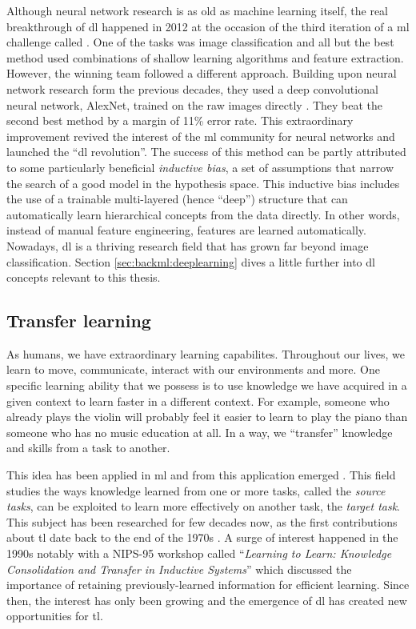 Although neural network research is as old as machine learning itself, the real
breakthrough of \acrlong{dl} happened in 2012 at the occasion of the third iteration
of a \acrlong{ml} challenge called  \cite{russakovsky2015imagenet}.
One of the tasks was image classification and all but the best method used
combinations of shallow learning algorithms and feature extraction. However, the
winning team followed a different approach. Building upon neural network research
form the previous decades, they used a deep convolutional neural network, AlexNet,
trained on the raw images directly \cite{krizhevsky2012imagenet}. They beat
the second best method by a margin of 11\% error rate. This extraordinary improvement
revived the interest of the \acrlong{ml} community for neural networks and launched
the ``\acrlong{dl} revolution''. The success of this method can be partly attributed
to some particularly beneficial \textit{inductive bias}, a set of assumptions
that narrow the search of a good model in the hypothesis space. This inductive
bias includes the use of a trainable multi-layered (hence ``deep'') structure that
can automatically learn hierarchical concepts from the data directly. In other
words, instead of manual feature engineering, features are learned automatically.
Nowadays, \acrlong{dl} is a thriving research field that has grown far beyond
image classification. Section \ref{sec:backml:deeplearning} dives a little further
into \acrlong{dl} concepts relevant to this thesis.

\subsection{Transfer learning}
\label{ssec:backml:transfer}

As humans, we have extraordinary learning capabilites. Throughout our lives, we
learn to move, communicate, interact with our environments and more. One specific
learning ability that we possess is to use knowledge we have acquired in a given
context to learn faster in a different context. For example, someone who already
plays the violin will probably feel it easier to learn to play the piano than
someone who has no music education at all. In a way, we ``transfer'' knowledge
and skills from a task to another.

This idea has been applied in \acrlong{ml} and from this application emerged
 \cite{yang2020transfer}. This field studies the ways knowledge
learned from one or more tasks, called the \textit{source tasks}, can be exploited
to learn more effectively on another task, the \textit{target task}. This subject
has been researched for few decades now, as the first contributions about \acrlong{tl}
date back to the end of the 1970s \cite{bozinovski2020reminder}. A surge of
interest happened in the 1990s notably with a NIPS-95 workshop called
``\textit{Learning to Learn: Knowledge Consolidation and Transfer in Inductive Systems}''
which discussed the importance of retaining previously-learned information for
efficient learning. Since then, the interest has only been growing and the emergence
of \acrlong{dl} has created new opportunities for \acrlong{tl}.

